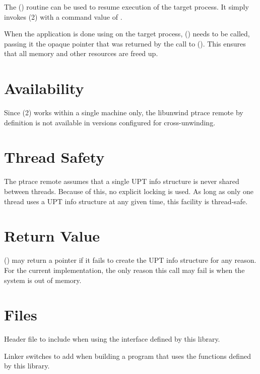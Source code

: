 \documentclass{article}
\begin{document}
The () routine can be used to resume execution of the target
process.  It simply invokes (2) with a command value of
.

When the application is done using  on the target process,
() needs to be called, passing it the opaque pointer that
was returned by the call to ().  This ensures that all
memory and other resources are freed up.

\section{Availability}

Since (2) works within a single machine only, the libunwind ptrace
remote by definition is not available in  versions configured
for cross-unwinding.

\section{Thread Safety}

The  ptrace remote assumes that a single UPT info structure is
never shared between threads.  Because of this, no explicit locking is used.  As
long as only one thread uses a UPT info structure at any given time, this
facility is thread-safe.

\section{Return Value}

() may return a  pointer if it fails to create
the UPT info structure for any reason.  For the current implementation, the only
reason this call may fail is when the system is out of memory.

\section{Files}

\begin{Description}
\item[\File{libunwind-ptrace.h}] Header file to include when using the
    interface defined by this library.
\item[\Opt{-l}\File{unwind-ptrace} \Opt{-l}\File{unwind-generic}]
    Linker switches to add when building a program that uses the
    functions defined by this library.
\end{Description}
\end{document}
